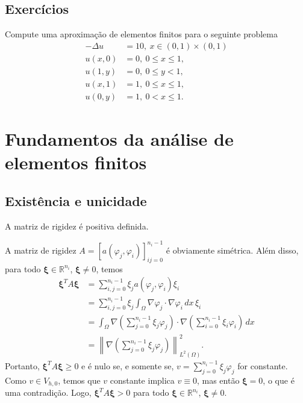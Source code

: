 \subsection{Exercícios}
\badgeRevisar

\begin{exer}
  Compute uma aproximação de elementos finitos para o seguinte problema
\begin{align}
  -\Delta u &= 10,~x\in (0, 1)\times (0, 1)\\
  u(x,0) &= 0,~0\leq x \leq 1,\\
  u(1,y) &= 0,~0\leq y < 1,\\
  u(x,1) &= 1,~0\leq x \leq 1,\\
  u(0,y) &= 1,~0<x\leq 1.
\end{align}
\end{exer}

\section{Fundamentos da análise de elementos finitos}\label{cap_mef2d_sec_funanlef}
\badgeRevisar

\subsection{Existência e unicidade}
\badgeRevisar

\begin{teo}\label{teo:matriz_definida_positiva}
  A matriz de rigidez é positiva definida.
\end{teo}
\begin{dem}
  A matriz de rigidez $A = [a(\varphi_j,\varphi_i)]_{ij=0}^{n_i-1}$ é obviamente simétrica. Além disso, para todo $\pmb{\xi}\in\mathbb{R}^{n_i}$, $\pmb{\xi}\neq 0$, temos
  \begin{align}
    \pmb{\xi}^TA\pmb{\xi} &= \sum_{i,j=0}^{n_i-1} \xi_ja(\varphi_j,\varphi_i)\xi_i\\
    &= \sum_{i,j=0}^{n_i-1}\xi_j\int_\Omega \nabla \varphi_j\cdot\nabla\varphi_i\,dx\,\xi_i\\
    &= \int_\Omega \nabla \left(\sum_{j=0}^{n_i-1}\xi_j\varphi_j\right)\cdot\nabla \left(\sum_{i=0}^{n_i-1}\xi_i\varphi_i\right)\,dx\\
    &= \left\|\nabla \left(\sum_{j=0}^{n_i-1}\xi_j\varphi_j\right) \right\|_{L^2(\Omega)}^2.
  \end{align}
  Portanto, $\pmb{\xi}^TA\pmb{\xi} \geq 0$ e é nulo se, e somente se, $v = \sum_{j=0}^{n_i-1}\xi_j\varphi_j$ for constante. Como $v\in V_{h,0}$, temos que $v$ constante implica $v\equiv 0$, mas então $\pmb{\xi}=0$, o que é uma contradição. Logo, $\pmb{\xi}^TA\pmb{\xi} > 0$ para todo $\pmb{\xi}\in\mathbb{R}^{n_i}$, $\pmb{\xi}\neq 0$.
\end{dem}

